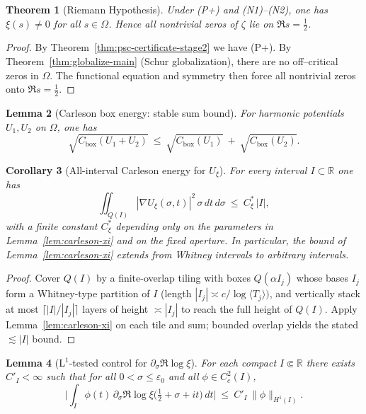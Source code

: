 \documentclass[11pt]{article}
\newtheorem{theorem}{Theorem}
\newtheorem{lemma}[theorem]{Lemma}
\newtheorem{corollary}[theorem]{Corollary}
\theoremstyle{definition}
\theoremstyle{remark}
\newcommand{\R}{\mathbb{R}}
\begin{document}
\bigskip
\begin{theorem}[Riemann Hypothesis]\label{thm:RH}
Under \textnormal{(P+)} and \textnormal{(N1)}--\textnormal{(N2)}, one has $\xi(s)\neq 0$ for all $s\in\Omega$. Hence all nontrivial zeros of $\zeta$ lie on $\Re s=\tfrac12$.
\end{theorem}
\begin{proof}
By Theorem~\ref{thm:psc-certificate-stage2} we have (P+). By Theorem~\ref{thm:globalize-main} (Schur globalization), there are no off--critical zeros in $\Omega$. The functional equation and symmetry then force all nontrivial zeros onto $\Re s=\tfrac12$.
\end{proof}

\begin{lemma}[Carleson box energy: stable sum bound]\label{lem:carleson-sum}
For harmonic potentials $U_1,U_2$ on $\Omega$, one has
\[
\sqrt{C_{\mathrm{box}}(U_1+U_2)}\ \le\
\sqrt{C_{\mathrm{box}}(U_1)}\ +\ \sqrt{C_{\mathrm{box}}(U_2)}.
\]
\end{lemma}

\begin{corollary}[All-interval Carleson energy for $U_\xi$]\label{cor:xi-carleson-all-I}
For every interval $I\subset\R$ one has
\[
  \iint_{Q(I)} |\nabla U_{\xi}(\sigma,t)|^2\,\sigma\,dt\,d\sigma\ \le\ C_\xi^{\!*}\,|I|,
\]
with a finite constant $C_\xi^{\!*}$ depending only on the parameters in Lemma~\ref{lem:carleson-xi} and on the fixed aperture. In particular, the bound of Lemma~\ref{lem:carleson-xi} extends from Whitney intervals to arbitrary intervals.
\end{corollary}
\begin{proof}
Cover $Q(I)$ by a finite-overlap tiling with boxes $Q(\alpha I_j)$ whose bases $I_j$ form a Whitney-type partition of $I$ (length $|I_j|\asymp c/\log\langle T_j\rangle)$, and vertically stack at most $\lceil |I|/|I_j|\rceil$ layers of height $\asymp |I_j|$ to reach the full height of $Q(I)$. Apply Lemma~\ref{lem:carleson-xi} on each tile and sum; bounded overlap yields the stated $\lesssim |I|$ bound.
\end{proof}

\begin{lemma}[L$^1$-tested control for $\partial_\sigma\Re\log\xi$]\label{lem:xi-deriv-L1}
For each compact $I\Subset\R$ there exists $C'_I<\infty$ such that for all $0<\sigma\le\varepsilon_0$ and all $\phi\in C_c^2(I)$,
\[
\Big|\int_I \phi(t)\,\partial_\sigma\Re\log\xi\!\big(\tfrac12+\sigma+it\big)\,dt\Big|
\ \le\ C'_I\,\|\phi\|_{H^1(I)}.
\]
\end{lemma}
\end{document}
